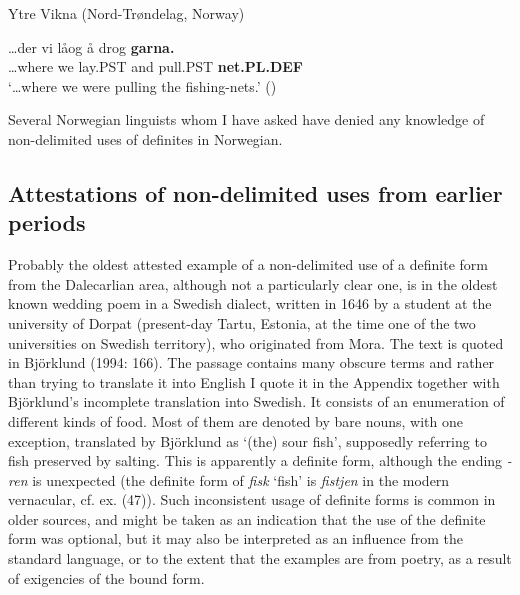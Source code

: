 
\item 

Ytre Vikna (Nord-Trøndelag, Norway)



 \ea\label{}
\gll …der  vi  låog  å  drog  \textbf{garna.}\textit{  }\\


…where  we  lay.PST   and  pull.PST  \textbf{net.PL.DEF} \\

\glt ‘…where we were pulling the fishing-nets.’ (\citet[16]{Delsing2003a})

\z

Several Norwegian linguists whom I have asked have denied any knowledge of non-delimited uses of definites in Norwegian. 


\subsection{\rmfamily Attestations of non-delimited uses from earlier periods}
\label{bkm:Ref154983425}
Probably the oldest attested example of a non-delimited use of a definite form from the Dalecarlian area, although not a particularly clear one, is in the oldest known wedding poem in a Swedish dialect, written in 1646 by a student at the university of Dorpat (present-day Tartu, Estonia, at the time one of the two universities on Swedish territory), who originated from Mora. The text is quoted in Björklund (1994: 166). The passage contains many obscure terms and rather than trying to translate it into English I quote it in the Appendix together with Björklund’s incomplete translation into Swedish. It consists of an enumeration of different kinds of food. Most of them are denoted by bare nouns, with one exception, translated by Björklund as  ‘(the) sour fish’, supposedly referring to fish preserved by salting. This is apparently a definite form, although the ending \textit{{}-ren} is unexpected (the definite form of \textit{fisk} ‘fish’ is \textit{fistjen} in the modern vernacular, cf. ex. (47)). Such inconsistent usage of definite forms is common in older sources, and might be taken as an indication that the use of the definite form was optional, but it may also be interpreted as an influence from the standard language, or to the extent that the examples are from poetry, as a result of exigencies of the bound form. 

